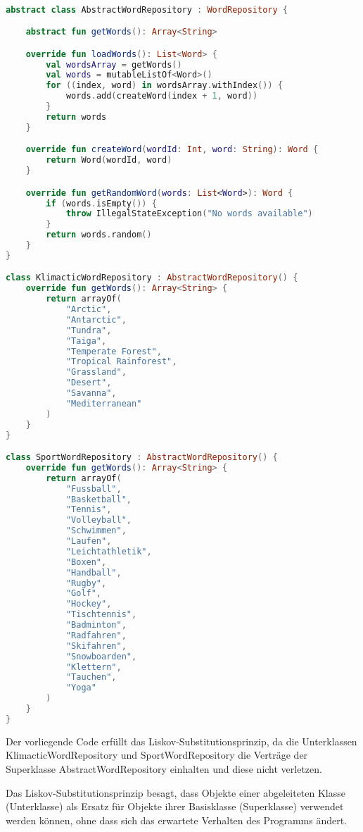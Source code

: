 \begin{lstlisting}[language=Kotlin, caption={Liskov Substitution Principle}, label={lst:15}]

abstract class AbstractWordRepository : WordRepository {

    abstract fun getWords(): Array<String>

    override fun loadWords(): List<Word> {
        val wordsArray = getWords()
        val words = mutableListOf<Word>()
        for ((index, word) in wordsArray.withIndex()) {
            words.add(createWord(index + 1, word))
        }
        return words
    }

    override fun createWord(wordId: Int, word: String): Word {
        return Word(wordId, word)
    }

    override fun getRandomWord(words: List<Word>): Word {
        if (words.isEmpty()) {
            throw IllegalStateException("No words available")
        }
        return words.random()
    }
}

class KlimacticWordRepository : AbstractWordRepository() {
    override fun getWords(): Array<String> {
        return arrayOf(
            "Arctic",
            "Antarctic",
            "Tundra",
            "Taiga",
            "Temperate Forest",
            "Tropical Rainforest",
            "Grassland",
            "Desert",
            "Savanna",
            "Mediterranean"
        )
    }
}

class SportWordRepository : AbstractWordRepository() {
    override fun getWords(): Array<String> {
        return arrayOf(
            "Fussball",
            "Basketball",
            "Tennis",
            "Volleyball",
            "Schwimmen",
            "Laufen",
            "Leichtathletik",
            "Boxen",
            "Handball",
            "Rugby",
            "Golf",
            "Hockey",
            "Tischtennis",
            "Badminton",
            "Radfahren",
            "Skifahren",
            "Snowboarden",
            "Klettern",
            "Tauchen",
            "Yoga"
        )
    }
}
\end{lstlisting}

Der vorliegende Code erfüllt das Liskov-Substitutionsprinzip, da die Unterklassen KlimacticWordRepository und SportWordRepository die Verträge der Superklasse AbstractWordRepository einhalten und diese nicht verletzen.

Das Liskov-Substitutionsprinzip besagt, dass Objekte einer abgeleiteten Klasse (Unterklasse) als Ersatz für Objekte ihrer Basisklasse (Superklasse) verwendet werden können, ohne dass sich das erwartete Verhalten des Programms ändert.

